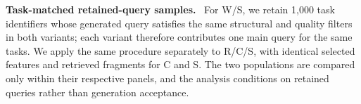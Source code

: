 \documentclass[acmsmall,screen,anonymous]{acmart}
\newcommand{\cnpara}[1]{\par\noindent\textbf{#1.}\ }
\begin{document}
\cnpara{Task-matched retained-query samples}
For W/S, we retain 1,000 task identifiers whose generated query satisfies the same structural and quality filters in both variants; each variant therefore contributes one main query for the same tasks. We apply the same procedure separately to R/C/S, with identical selected features and retrieved fragments for C and S. The two populations are compared only within their respective panels, and the analysis conditions on retained queries rather than generation acceptance.

\newcommand{\NeoCovHistDB}{37.600}
\newcommand{\NeoCovGRASpDB}{26.117}
\newcommand{\NeoCovGRev}{23.042}
\newcommand{\NeoCovDinkel}{21.765}
\newcommand{\NeoCovGDBMeter}{16.811}
\newcommand{\NeoCovGamera}{16.527}
\newcommand{\NeoCovGDsmith}{13.388}

\newcommand{\MemCovHistDB}{29.630}
\newcommand{\MemCovGRASpDB}{19.324}
\newcommand{\MemCovDinkel}{18.162}
\newcommand{\MemCovGamera}{16.083}
\newcommand{\MemCovGDsmith}{15.064}
\newcommand{\MemCovGRev}{14.875}
\newcommand{\MemCovGDBMeter}{14.713}
\end{document}
